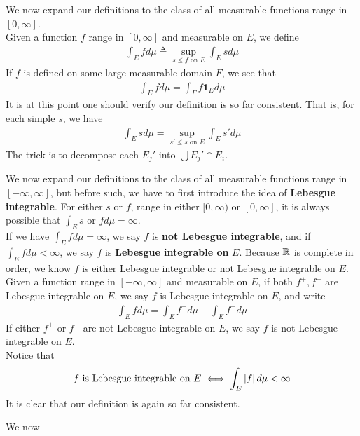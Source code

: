 \documentclass{report}
\begin{document}
\begin{mdframed}
We now expand our definitions to the class of all measurable functions range in $[0,\infty]$.\\

Given a function $f$ range in $[0,\infty]$ and measurable on $E$, we define 
\begin{align*}
\int_E fd\mu \triangleq \sup_{s\leq f\text{ on }E} \int_E s d\mu
\end{align*}
If $f$ is defined on some large measurable domain $F$, we see that 
 \begin{align*}
\int_Efd\mu= \int_F f\textbf{1}_Ed\mu
\end{align*}
It is at this point one should verify our definition is so far consistent. That is, for each simple $s$, we have 
\begin{align*}
\int_Esd\mu=\sup_{s'\leq s\text{ on }E}\int_Es'd\mu
\end{align*}
The trick is to decompose each $E_j'$ into $\bigcup E_j'\cap E_i$. 
\end{mdframed}

\begin{mdframed}
We now expand our definitions to the class of all measurable functions range in $[-\infty,\infty]$, but before such, we have to first introduce the idea of \textbf{Lebesgue integrable}. For either $s$ or  $f$, range in either $[0,\infty)$ or $[0,\infty]$, it is always possible that $\int_E s\text{ or }fd\mu=\infty$.\\ 

If we have $\int_Efd\mu=\infty$, we say $f$ is \textbf{not Lebesgue integrable}, and if $\int_Efd\mu<\infty$, we say $f$ is \textbf{Lebesgue integrable on }$E$. Because $\mathbb{R}$ is complete in order, we know $f$ is either Lebesgue integrable or not Lebesgue integrable on $E$.\\

Given a function range in $[-\infty,\infty]$ and measurable on $E$, if both $f^+,f^-$ are Lebesgue integrable on $E$, we say  $f$ is Lebesgue integrable on $E$, and write 
\begin{align*}
\int_E fd\mu= \int_E f^+d\mu- \int_E f^-d\mu
\end{align*}
If either  $f^+$ or  $f^-$ are not Lebesgue integrable on $E$, we say $f$ is not Lebesgue integrable on $E$.\\

Notice that 
\begin{align*}
f\text{ is Lebesgue integrable on }E\iff \int_E \left|f\right|d\mu<\infty
\end{align*}
It is clear that our definition is again so far consistent.
\end{mdframed}
\begin{mdframed}
We now 
\end{mdframed}
\end{document}
